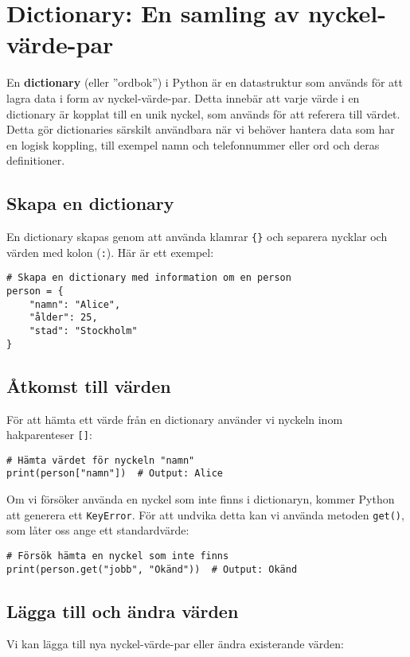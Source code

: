 \section{Dictionary: En samling av nyckel-värde-par}
\label{section:dictionary}
En \textbf{dictionary} (eller ''ordbok'') i Python är en datastruktur som används för att lagra data i form av nyckel-värde-par. Detta innebär att varje värde i en dictionary är kopplat till en unik nyckel, som används för att referera till värdet. Detta gör dictionaries särskilt användbara när vi behöver hantera data som har en logisk koppling, till exempel namn och telefonnummer eller ord och deras definitioner.

\subsection{Skapa en dictionary}
En dictionary skapas genom att använda klamrar \texttt{\{\}} och separera nycklar och värden med kolon (\texttt{:}). Här är ett exempel:

\begin{lstlisting}[title=Skapa en dictionary]
# Skapa en dictionary med information om en person
person = {
    "namn": "Alice",
    "ålder": 25,
    "stad": "Stockholm"
}
\end{lstlisting}

\subsection{Åtkomst till värden}
För att hämta ett värde från en dictionary använder vi nyckeln inom hakparenteser \texttt{[]}:

\begin{lstlisting}[title=Hämta värden från en dictionary]
# Hämta värdet för nyckeln "namn"
print(person["namn"])  # Output: Alice
\end{lstlisting}

Om vi försöker använda en nyckel som inte finns i dictionaryn, kommer Python att generera ett \texttt{KeyError}. För att undvika detta kan vi använda metoden \texttt{get()}, som låter oss ange ett standardvärde:

\begin{lstlisting}[title=Använda get-metoden]
# Försök hämta en nyckel som inte finns
print(person.get("jobb", "Okänd"))  # Output: Okänd
\end{lstlisting}

\subsection{Lägga till och ändra värden}
Vi kan lägga till nya nyckel-värde-par eller ändra existerande värden:


